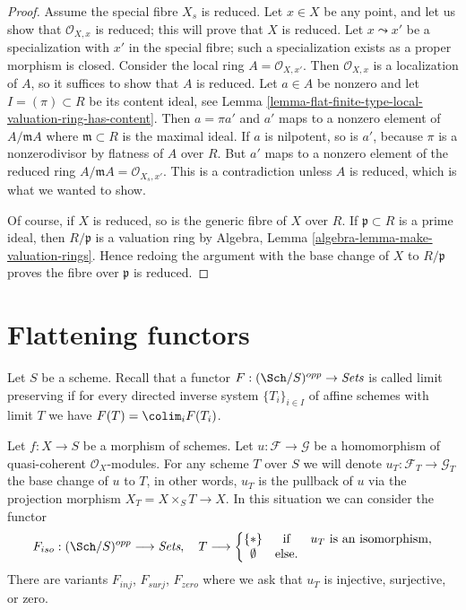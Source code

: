 \begin{proof}
Assume the special fibre $X_s$ is reduced.
Let $x \in X$ be any point, and let us show that $\mathcal{O}_{X, x}$
is reduced; this will prove that $X$ is reduced.
Let $x \leadsto x'$ be a specialization with $x'$
in the special fibre; such a specialization exists
as a proper morphism is closed. Consider the local
ring $A = \mathcal{O}_{X, x'}$. Then $\mathcal{O}_{X, x}$
is a localization of $A$, so it suffices to show that
$A$ is reduced. Let $a \in A$ be nonzero and let $I = (\pi) \subset R$ be its
content ideal, see
Lemma \ref{lemma-flat-finite-type-local-valuation-ring-has-content}.
Then $a = \pi a'$ and $a'$ maps to a nonzero element of
$A/\mathfrak mA$ where $\mathfrak m \subset R$ is the maximal ideal.
If $a$ is nilpotent, so is $a'$, because $\pi$ is a nonzerodivisor
by flatness of $A$ over $R$.
But $a'$ maps to a nonzero element of the reduced ring
$A/\mathfrak m A = \mathcal{O}_{X_s, x'}$.
This is a contradiction unless $A$ is reduced, which
is what we wanted to show.

\medskip\noindent
Of course, if $X$ is reduced, so is the generic fibre of $X$ over $R$.
If $\mathfrak p \subset R$ is a
prime ideal, then $R/\mathfrak p$ is a valuation ring by
Algebra, Lemma \ref{algebra-lemma-make-valuation-rings}.
Hence redoing the argument with the base change of $X$
to $R/\mathfrak p$ proves the fibre over $\mathfrak p$
is reduced.
\end{proof}






\section{Flattening functors}
\label{section-flattening-functors}

\noindent
Let $S$ be a scheme. Recall that a functor
$F : (\Sch/S)^{opp} \to \textit{Sets}$ is called limit preserving
if for every directed inverse system
$\{T_i\}_{i \in I}$ of affine schemes with limit $T$ we have
$F(T) = \colim_i F(T_i)$.

\begin{situation}
\label{situation-iso}
Let $f : X \to S$ be a morphism of schemes.
Let $u : \mathcal{F} \to \mathcal{G}$ be a homomorphism of
quasi-coherent $\mathcal{O}_X$-modules. For any scheme $T$ over
$S$ we will denote $u_T : \mathcal{F}_T \to \mathcal{G}_T$ the
base change of $u$ to $T$, in other words, $u_T$ is the pullback
of $u$ via the projection morphism $X_T = X \times_S T \to X$.
In this situation we can consider the functor
\begin{equation}
\label{equation-iso}
F_{iso} : (\Sch/S)^{opp} \longrightarrow \textit{Sets}, \quad
T \longrightarrow \left\{
\begin{matrix}
\{*\} & \text{if} & u_T \text{ is an isomorphism}, \\
\emptyset & \text{else.} &
\end{matrix}
\right.
\end{equation}
There are variants $F_{inj}$, $F_{surj}$, $F_{zero}$ where we ask that
$u_T$ is injective, surjective, or zero.
\end{situation}


